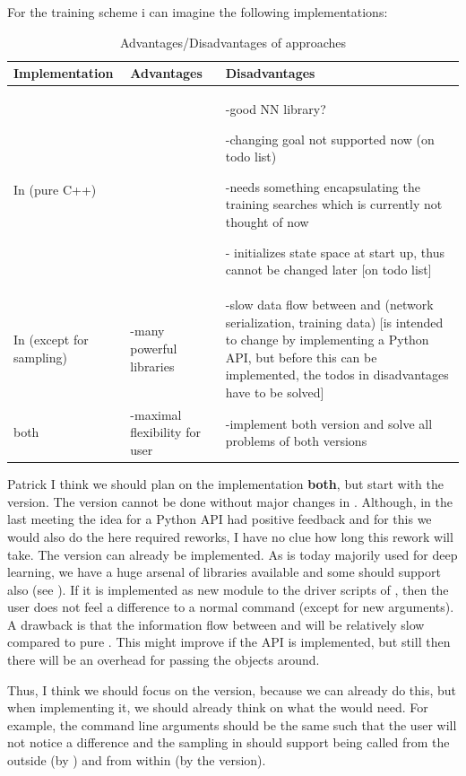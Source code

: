 \documentclass{report}
\begin{document}
\bigskip
\noindent{}For the training scheme i can imagine the following implementations:
\begin{table}[h]
\centering
\begin{tabular}{p{3cm}|p{2cm}|p{8cm}}	
Implementation & Advantages & Disadvantages\\\hline
In \fd{} (pure C++) & &
-good \cpp{} NN library?

-changing goal not supported now (on todo list)

-needs something encapsulating the training searches which is currently
not thought of now

-\fd{} initializes state space at start up, thus cannot be changed later
[on todo list]\\\hline

In \py{} (except \fd{} for sampling) & -many powerful libraries &
-slow data flow between \py{} and \fd{} (network serialization, training data)
[is intended to change by implementing a Python API, but before this can be
implemented, the todos in \fd{} disadvantages have to be solved]\\\hline
both & -maximal flexibility for user & -implement both version and solve all
problems of both versions
\end{tabular}
\caption{Advantages/Disadvantages of approaches}
\label{tbl-train-eval-scheme-adv-dis}
\end{table}


\noindent
\begin{edit}{Patrick}
I think we should plan on the implementation \textbf{both}, but start with the
\py{} version. The \cpp{} version cannot be done without major changes in \fd{}.
Although, in the last \fd{} meeting the idea for a Python API had positive
feedback and for this we would also do the here required reworks, I have no clue
how long this rework will take. The \py{} version can already be implemented. As
\py{} is today majorily used for deep learning, we have a huge arsenal of
libraries available and some should support also \cpp{} (see
). If it is implemented as new module to the
driver scripts of \fd{}, then the user does not feel a difference to a normal
\fd{} command (except for new arguments). A drawback is that the information
flow between \py{} and \cpp{} will be relatively slow compared to pure \cpp{}.
This might improve if the \py{} API is implemented, but still then there will be
an overhead for passing the objects around.

Thus, I think we should focus on the \py{} version, because we can already do
this, but when implementing it, we should already think on what the \cpp{} would
need. For example, the command line arguments should be the same such that the
user will not notice a difference and the sampling in \fd{} should support being
called from the outside (by \py{}) and from within (by the \cpp{} version).
\end{edit}
\end{document}
